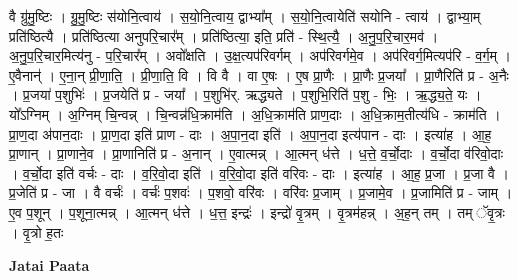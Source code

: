 \documentclass[17pt]{extarticle}
\begin{document}
वै ग्रु॑मु॒ष्टिः । ग्रु॒मु॒ष्टिः स॑योनि॒त्वाय॑ । स॒यो॒नि॒त्वाय॒ द्वाभ्या᳚म् । स॒यो॒नि॒त्वायेति॑ सयोनि - त्वाय॑ । द्वाभ्या॒म् प्रति॑ष्ठित्यै । प्रति॑ष्ठित्या अनुपरि॒चार᳚म् । प्रति॑ष्ठित्या॒ इति॒ प्रति॑ - स्थि॒त्यै॒ । अ॒नु॒प॒रि॒चार॒मव॑ । अ॒नु॒प॒रि॒चार॒मित्य॑नु - प॒रि॒चार᳚म् । अवो᳚क्षति । उ॒क्ष॒त्यप॑रिवर्गम् । अप॑रिवर्गमे॒व । अप॑रिवर्ग॒मित्यप॑रि - व॒र्ग॒म् । ए॒वैनान्॑ । ए॒ना॒न् प्री॒णा॒ति॒ । प्री॒णा॒ति॒ वि । वि वै । वा ए॒षः । ए॒ष प्रा॒णैः । प्रा॒णैः प्र॒जया᳚ । प्रा॒णैरिति॑ प्र - अ॒नैः । प्र॒जया॑ प॒शुभिः॑ । प्र॒जयेति॑ प्र - जया᳚ । प॒शुभि॑र्. ऋद्ध्यते । प॒शुभि॒रिति॑ प॒शु - भिः॒ । ऋ॒द्ध्य॒ते॒ यः । यो᳚ऽग्निम् । अ॒ग्निम् चि॒न्वन्न् । चि॒न्वन्न॑धि॒क्राम॑ति । अ॒धि॒क्राम॑ति प्राण॒दाः । अ॒धि॒क्राम॒तीत्य॑धि - क्राम॑ति । प्रा॒ण॒दा अ॑पान॒दाः । प्रा॒ण॒दा इति॑ प्राण - दाः । अ॒पा॒न॒दा इति॑ । अ॒पा॒न॒दा इत्य॑पान - दाः । इत्या॑ह । आ॒ह॒ प्रा॒णान् । प्रा॒णाने॒व । प्रा॒णानिति॑ प्र - अ॒नान् । ए॒वात्मन्न् । आ॒त्मन् ध॑त्ते । ध॒त्ते॒ व॒र्चो॒दाः । व॒र्चो॒दा व॑रिवो॒दाः । व॒र्चो॒दा इति॑ वर्चः - दाः । व॒रि॒वो॒दा इति॑ । व॒रि॒वो॒दा इति॑ वरिवः - दाः । इत्या॑ह । आ॒ह॒ प्र॒जा । प्र॒जा वै । प्र॒जेति॑ प्र - जा । वै वर्चः॑ । वर्चः॑ प॒शवः॑ । प॒शवो॒ वरि॑वः । वरि॑वः प्र॒जाम् । प्र॒जामे॒व । प्र॒जामिति॑ प्र - जाम् । ए॒व प॒शून् । प॒शूना॒त्मन्न् । आ॒त्मन् ध॑त्ते । ध॒त्त॒ इन्द्रः॑ । इन्द्रो॑ वृ॒त्रम् । वृ॒त्रम॑हन्न् । अ॒ह॒न् तम् । तम् ॅवृ॒त्रः । वृ॒त्रो ह॒तः \newline

\textbf{Jatai Paata} \newline
\end{document}
